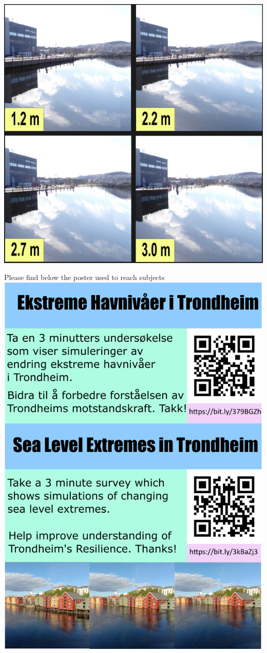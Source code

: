\paragraph{}
\includegraphics[scale=0.1]{fig_appendix/brattora 2090 q.png}


Please find below the poster used to reach subjects
\newpage
\includegraphics[width=1\textwidth]{fig_appendix/poster 4.0.png}